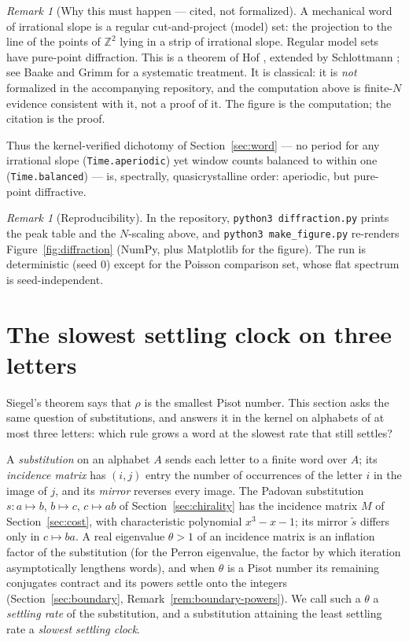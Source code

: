\documentclass[11pt]{amsart}
\theoremstyle{plain}
\theoremstyle{definition}
\theoremstyle{remark}
\newtheorem{remark}[theorem]{Remark}
\begin{document}
\begin{remark}[Why this must happen --- cited, not formalized]
\label{rem:modelset}
A mechanical word of irrational slope is a regular cut-and-project (model)
set: the projection to the line of the points of $\mathbb{Z}^2$ lying in a
strip of irrational slope. Regular model sets have pure-point diffraction.
This is a theorem of Hof \cite{hof1995}, extended by Schlottmann
\cite{schlottmann2000}; see Baake and Grimm \cite{baakegrimm2013} for a
systematic treatment. It is classical: it is \emph{not} formalized in the
accompanying repository, and the computation above is finite-$N$ evidence
consistent with it, not a proof of it. The figure is the computation; the
citation is the proof.
\end{remark}

Thus the kernel-verified dichotomy of Section~\ref{sec:word} --- no period for
any irrational slope (\texttt{Time.aperiodic}) yet window counts balanced to
within one (\texttt{Time.balanced}) --- is, spectrally, quasicrystalline
order: aperiodic, but pure-point diffractive.

\begin{remark}[Reproducibility]
\label{rem:repro}
In the repository, \texttt{python3 diffraction.py} prints the peak table and
the $N$-scaling above, and \texttt{python3 make\_figure.py} re-renders
Figure~\ref{fig:diffraction} (NumPy, plus Matplotlib for the figure). The run
is deterministic (seed $0$) except for the Poisson comparison set, whose flat
spectrum is seed-independent.
\end{remark}

\section{The slowest settling clock on three letters}
\label{sec:unique}

Siegel's theorem says that $\rho$ is the smallest Pisot number. This section asks the same
question of substitutions, and answers it in the kernel on alphabets of at most three
letters: which rule grows a word at the slowest rate that still settles?

A \emph{substitution} on an alphabet $A$ sends each letter to a finite word over $A$; its
\emph{incidence matrix} has $(i,j)$ entry the number of occurrences of the letter $i$ in the
image of $j$, and its \emph{mirror} reverses every image. The Padovan substitution
$s \colon a \mapsto b$, $b \mapsto c$, $c \mapsto ab$ of Section~\ref{sec:chirality} has the
incidence matrix $M$ of Section~\ref{sec:cost}, with characteristic polynomial
$x^3 - x - 1$; its mirror $\tilde s$ differs only in $c \mapsto ba$. A real eigenvalue
$\theta > 1$ of an incidence matrix is an inflation factor of the substitution (for the Perron
eigenvalue, the factor by which iteration asymptotically lengthens words), and when $\theta$ is
a Pisot number its remaining conjugates contract and its powers settle onto the integers
(Section~\ref{sec:boundary}, Remark~\ref{rem:boundary-powers}). We call such a $\theta$ a
\emph{settling rate} of the substitution, and a substitution attaining the least settling rate
a \emph{slowest settling clock}.
\end{document}
